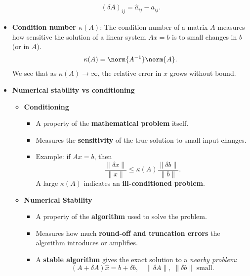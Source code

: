 \documentclass{report}
\begin{document}
\begin{itemize}
            \begin{align*}
                \left(\delta A\right)_{ij} = \hat{a}_{ij} - a_{ij}
            .\end{align*}
        \item \textbf{Condition number $\kappa(A)$}: The condition number of a matrix $A$ measures how sensitive the solution of a linear system $A x = b$ is to small changes in $b$ (or in $A$).
            \begin{align*}
                \kappa(A) = \norm{A^{-1}}\norm{A}
            .\end{align*}
            \bigbreak \noindent 
            We see that as $\kappa(A) \to \infty$, the relative error in $x$ grows without bound.
        \item \textbf{Numerical stability vs conditioning}
            \begin{itemize}
                \item \textbf{Conditioning}
                \begin{itemize}
                    \item A property of the \textbf{mathematical problem} itself.
                    \item Measures the \textbf{sensitivity} of the true solution to small input changes.
                    \item Example: if $A x = b$, then
                        \[
                            \frac{\|\delta x\|}{\|x\|} \le \kappa(A) \frac{\|\delta b\|}{\|b\|}.
                        \]
                        A large $\kappa(A)$ indicates an \textbf{ill-conditioned problem}.
                \end{itemize}
            \item \textbf{Numerical Stability}
                \begin{itemize}
                    \item A property of the \textbf{algorithm} used to solve the problem.
                    \item Measures how much \textbf{round-off and truncation errors} the algorithm introduces or amplifies.
                    \item A \textbf{stable algorithm} gives the exact solution to a \textit{nearby problem}:
                        \[
                            (A + \delta A)\hat{x} = b + \delta  b , \quad \|\delta A\|,\; \| \delta b\| \text{ small.}
                        \]
                \end{itemize}
        \end{itemize}

\end{itemize}
\end{document}
